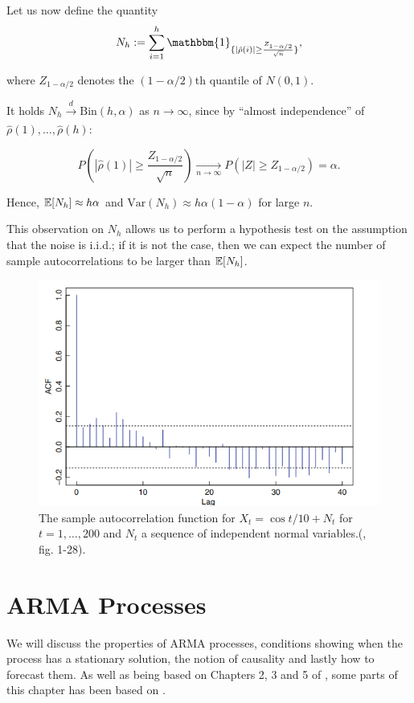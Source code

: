 \documentclass[a4paper, oneside]{discothesis}
\begin{document}
Let us now define the quantity
\begin{equation*}
    N_h := \sum_{i=1}^h \mathbbm{1}_{ \{|\hat{\rho}(i)| \geq \frac{Z_{1-\alpha/2}}{\sqrt{n}} \} },
\end{equation*}

where $Z_{1-\alpha/2}$ denotes the $(1-\alpha/2)$th quantile of $N(0,1)$.

It holds $N_h \xrightarrow[]{d} \mathrm{Bin}(h, \alpha)$ as $n \to \infty$, since by ``almost independence'' of $\hat{\rho}(1), \dots, \hat{\rho}(h)$:

\begin{equation*}
    P(|\hat{\rho}(1)| \geq \frac{Z_{1- \alpha/2}}{\sqrt{n}}) \xrightarrow[n\to\infty]{} P(|Z| \geq Z_{1- \alpha/2}) = \alpha.
\end{equation*}

Hence, $\operatorname{\mathbb{E}}[N_h] \approx h\alpha$ and $\mathrm{Var}(N_h) \approx h \alpha (1-\alpha)$ for large $n$.

This observation on $N_h$ allows us to perform a hypothesis test on the assumption that the noise is i.i.d.; if it is not the case, then we can expect the number of sample autocorrelations to be larger than $\operatorname{\mathbb{E}}[N_h]$.

\begin{figure}[ht]
\centering
\includegraphics[width=.6\textwidth]{figures/fig1-28.png}
\caption{The sample autocorrelation function for $X_t = \cos{t/10} + N_t$ for $t = 1, \dots, 200$ and $N_t$ a sequence of independent normal variables.(\cite{itsf}, fig. 1-28).}
\end{figure}

\chapter{ARMA Processes}
We will discuss the properties of ARMA processes, conditions showing when the process has a stationary solution, the notion of causality and lastly how to forecast them. As well as being based on Chapters 2, 3 and 5 of \cite{itsf}, some parts of this chapter has been based on \cite{chatfield}.
\end{document}
